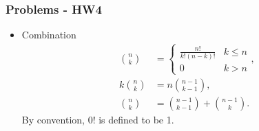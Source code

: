 \documentclass[serif,mathserif,professionalfont]{beamer}
\begin{document}
\begin{frame}
	
	\frametitle{Problems - HW4}
	
	\begin{itemize}
		\item Combination
		\begin{equation*}
		\begin{split}
		{n \choose k} & = 
		\begin{cases}
		\frac{n!}{k! \left(n-k \right)!} & k \leq n \\
		0 & k > n
		\end{cases}, \\[1em]
		k {n \choose k} & = n {n-1 \choose k-1}, \\[1em]
		{n \choose k} & = {n-1 \choose k-1}  + {n-1 \choose k}.
		\end{split}
		\end{equation*}
		By convention, $ 0! $ is defined to be 1.
	\end{itemize}
	
	
\end{frame}







%	
%	
%	
%	










\end{document}
